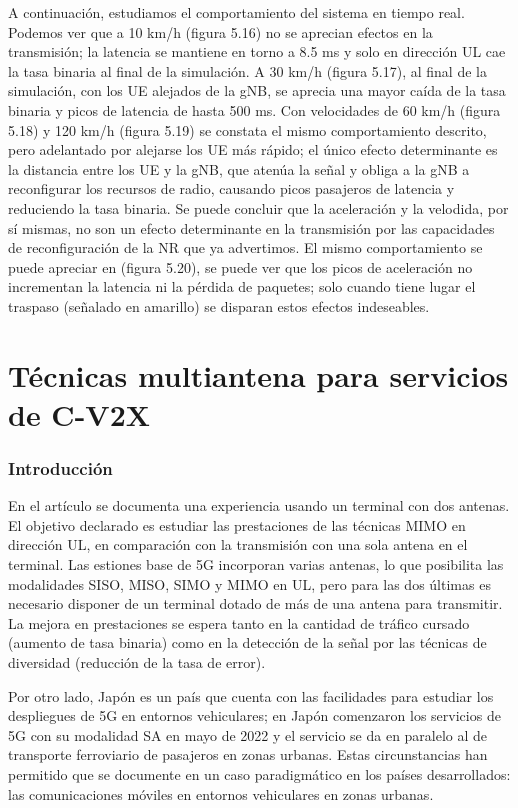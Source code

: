 \documentclass[12pt]{report} %
\begin{document}
A continuación, estudiamos el comportamiento del sistema en tiempo real.
Podemos ver que a 10 km/h (figura 5.16) no se aprecian efectos en la transmisión;
la latencia se mantiene en torno a 8.5 ms y solo en dirección UL cae la tasa binaria al final de la simulación.
A 30 km/h (figura 5.17), al final de la simulación, con los UE alejados de la gNB, se aprecia una mayor caída de la tasa binaria y picos de latencia de hasta 500 ms.
Con velocidades de 60 km/h (figura 5.18) y 120 km/h (figura 5.19) se constata el mismo comportamiento descrito, pero adelantado por alejarse los UE más rápido;
el único efecto determinante es la distancia entre los UE y la gNB, que atenúa la señal y obliga a la gNB a reconfigurar los recursos de radio, causando picos pasajeros de latencia y reduciendo la tasa binaria.
Se puede concluir que la aceleración y la velodida, por sí mismas, no son un efecto determinante en la transmisión por las capacidades de reconfiguración de la NR que ya advertimos.
El mismo comportamiento se puede apreciar en \cite{RefWorks:25} (figura 5.20),
se puede ver que los picos de aceleración no incrementan la latencia ni la pérdida de paquetes;
solo cuando tiene lugar el traspaso (señalado en amarillo) se disparan estos efectos indeseables.

\section{Técnicas multiantena para servicios de C-V2X}

\subsubsection{Introducción}

En el artículo \cite{RefWorks:49} se documenta una experiencia usando un terminal con dos antenas.
El objetivo declarado es estudiar las prestaciones de las técnicas MIMO en dirección UL,
en comparación con la transmisión con una sola antena en el terminal.
Las estiones base de 5G incorporan varias antenas, lo que posibilita las modalidades SISO, MISO, SIMO y MIMO en UL,
pero para las dos últimas es necesario disponer de un terminal dotado de más de una antena para transmitir.
La mejora en prestaciones se espera tanto en la cantidad de tráfico cursado (aumento de tasa binaria)
como en la detección de la señal por las técnicas de diversidad (reducción de la tasa de error).

Por otro lado, Japón es un país que cuenta con las facilidades para estudiar los despliegues de 5G en entornos vehiculares;
en Japón comenzaron los servicios de 5G con su modalidad SA en mayo de 2022
y el servicio se da en paralelo al de transporte ferroviario de pasajeros en zonas urbanas.
Estas circunstancias han permitido que se documente en \cite{RefWorks:49} un caso paradigmático en los países desarrollados:
las comunicaciones móviles en entornos vehiculares en zonas urbanas.
\end{document}
